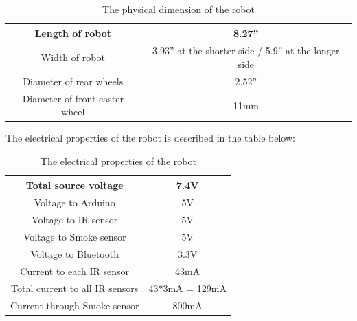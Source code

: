 \begin{table}[h]
\begin{center}
\begin{tabular}{|c|c|}
\hline
Length of robot	&8.27”\\
\hline 
Width of robot	&3.93” at the shorter side / 5.9” at the longer side\\
\hline 
Diameter of rear wheels	& 2.52”\\
\hline 
Diameter of front caster wheel&	11mm\\
\hline
\end{tabular}
\end{center}
\caption{The physical dimension of the robot}
\end{table}
\justify The electrical properties of the robot is described in the table below:
\newpage
\begin{table}
\begin{center}
\begin{tabular}{|c|c|}
\hline
Total source voltage &7.4V\\
\hline
Voltage to Arduino &5V\\
\hline 
Voltage to IR sensor& 5V\\
\hline 
Voltage to Smoke sensor& 5V\\
\hline 
Voltage to Bluetooth &3.3V\\
\hline 
Current to each IR sensor& 43mA\\
\hline 
Total current to all IR sensors& 43*3mA = 129mA\\
\hline 
Current through Smoke sensor &800mA\\
\hline
\end{tabular}
\end{center}
\caption{The electrical properties of the robot}
\end{table}
